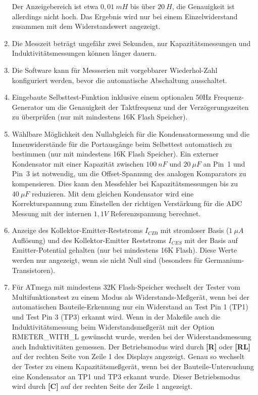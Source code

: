\begin{enumerate}
Der Anzeigebereich ist etwa \(0,01~mH\) bis über \(20~H\), die Genauigkeit ist allerdings nicht hoch.
Das Ergebnis wird nur bei einem Einzelwiderstand zusammen mit dem Widerstandswert angezeigt.
\item Die Messzeit beträgt ungefähr zwei Sekunden, nur Kapazitätsmessungen und Induktivitätsmessungen können länger dauern.
\item Die Software kann für Messserien mit vorgebbarer Wiederhol-Zahl konfiguriert werden, bevor die automatische Abschaltung ausschaltet.
\item Eingebaute Selbsttest-Funktion inklusive einem optionalen 50Hz Frequenz-Generator um die Genauigkeit der Taktfrequenz
und der Verzögerungszeiten zu überprüfen (nur mit mindestens 16K Flash Speicher).
\item Wählbare Möglichkeit den Nullabgleich für die Kondensatormessung und die Innenwiderstände für die
Portausgänge beim Selbsttest automatisch zu bestimmen (nur mit mindestens 16K Flash Speicher).
Ein externer Kondensator mit einer Kapazität zwischen \(100~nF\) und \(20~\mu F\) an Pin~1 und Pin~3 ist notwendig, 
um die Offset-Spannung des analogen Komparators zu kompensieren.
Dies kann den Messfehler bei Kapazitätsmessungen bis zu \(40~\mu F\) reduzieren.
Mit dem gleichen Kondensator wird eine Korrekturspannung zum Einstellen der richtigen Verstärkung für
die ADC Messung mit der internen \(1,1V\) Referenzspannung berechnet.
\item Anzeige des Kollektor-Emitter-Reststroms \(I_{CE0}\) mit stromloser Basis (\(1~\mu A\) Auflösung) und
des Kollektor-Emitter Reststroms \(I_{CES}\) mit der Basis auf Emitter-Potential gehalten (nur bei mindestens 16K Flash).
Diese Werte werden nur angezeigt, wenn sie nicht Null sind (besonders für Germanium-Transistoren).
\item Für ATmega mit mindestens 32K Flash-Speicher wechselt der Tester vom Multifunktionstest zu einem Modus als
Widerstands-Meßgerät, wenn bei der automatischen Bauteile-Erkennung nur ein Widerstand an Test Pin 1 (TP1) und
Test Pin 3 (TP3) erkannt wird. Wenn in der Makefile auch die Induktivitätsmessung beim Widerstandsmeßgerät
mit der Option RMETER\_WITH\_L gewünscht wurde, werden bei der Widerstandsmessung auch Induktivitäten gemessen.
Der Betriebsmodus wird durch {\bf[R]} oder {\bf[RL]} auf der rechten Seite von Zeile 1 des Displays angezeigt.
Genau so wechselt der Tester zu einem Kapazitätsmeßgerät, wenn bei der Bauteile-Untersuchung
eine Kondensator an TP1 und TP3 erkannt wurde. Dieser Betriebsmodus wird durch {\bf[C]} auf der rechten Seite der Zeile 1 angezeigt.

\end{enumerate}
